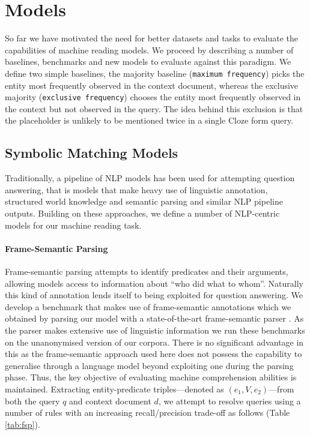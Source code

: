 \section{Models}
\label{models}

So far we have motivated the need for better datasets and tasks to evaluate the
capabilities of machine reading models. We proceed by describing a number of
baselines, benchmarks and new models to evaluate against this paradigm.  We
define two simple baselines, the majority baseline ({\tt maximum frequency})
picks the entity most frequently observed in the context document, whereas the
exclusive majority ({\tt exclusive frequency}) chooses the entity most
frequently observed in the context but not observed in the query. The idea
behind this exclusion is that the placeholder is unlikely to be mentioned twice
in a single Cloze form query.

\subsection{Symbolic Matching Models}

Traditionally, a pipeline of NLP models has been used for attempting question
answering, that is models that make heavy use of linguistic annotation,
structured world knowledge and semantic parsing and similar NLP pipeline
outputs.
Building on these approaches, we define a number of NLP-centric models for our
machine reading task.

\paragraph{Frame-Semantic Parsing}

Frame-semantic parsing attempts to identify predicates and their arguments,
allowing models access to information about ``who did what to whom''. Naturally
this kind of annotation lends itself to being exploited for question answering.
We develop a benchmark that makes use of frame-semantic annotations
which we obtained by parsing our model with a state-of-the-art frame-semantic
parser \cite{Das:2013:SRL,Hermann:2014:SRL}. As the parser makes extensive use
of linguistic information we run these benchmarks on the unanonymised version of
our corpora. There is no significant advantage in this as the frame-semantic
approach used here does not possess the capability to generalise through a
language model beyond exploiting one during the parsing phase.
Thus, the key objective of evaluating machine comprehension abilities is
maintained. Extracting entity-predicate triples---denoted as
$(e_1,V,e_2)$---from both the query $q$ and context document $d$, we attempt to
resolve queries using a number of rules with an increasing recall/precision
trade-off as follows (Table \ref{tab:fsp}).

